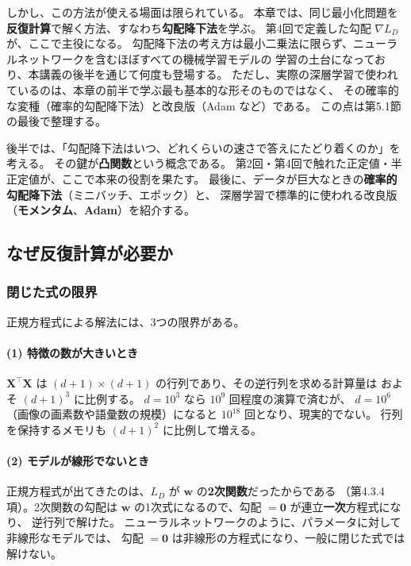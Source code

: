 しかし、この方法が使える場面は限られている。
本章では、同じ最小化問題を\textbf{反復計算}で解く方法、すなわち\textbf{勾配降下法}を学ぶ。
第4回で定義した勾配 $\nabla L_D$ が、ここで主役になる。
勾配降下法の考え方は最小二乗法に限らず、ニューラルネットワークを含むほぼすべての機械学習モデルの
学習の土台になっており、本講義の後半を通じて何度も登場する。
ただし、実際の深層学習で使われているのは、本章の前半で学ぶ最も基本的な形そのものではなく、
その確率的な変種（確率的勾配降下法）と改良版（Adam など）である。
この点は第5.1節の最後で整理する。

後半では、「勾配降下法はいつ、どれくらいの速さで答えにたどり着くのか」を考える。
その鍵が\textbf{凸関数}という概念である。
第2回・第4回で触れた正定値・半正定値が、ここで本来の役割を果たす。
最後に、データが巨大なときの\textbf{確率的勾配降下法}（ミニバッチ、エポック）と、
深層学習で標準的に使われる改良版（\textbf{モメンタム}、\textbf{Adam}）を紹介する。


\subsection{なぜ反復計算が必要か}

\subsubsection{閉じた式の限界}

正規方程式による解法には、3つの限界がある。

\paragraph{(1) 特徴の数が大きいとき}
$\bm{X}^\top\bm{X}$ は $(d+1) \times (d+1)$ の行列であり、その逆行列を求める計算量は
およそ $(d+1)^3$ に比例する。
$d = 10^3$ なら $10^9$ 回程度の演算で済むが、
$d = 10^6$（画像の画素数や語彙数の規模）になると $10^{18}$ 回となり、現実的でない。
行列を保持するメモリも $(d+1)^2$ に比例して増える。

\paragraph{(2) モデルが線形でないとき}
正規方程式が出てきたのは、$L_D$ が $\bm{w}$ の\textbf{2次関数}だったからである
（第4.3.4項）。2次関数の勾配は $\bm{w}$ の1次式になるので、勾配 $= \bm{0}$ が連立\textbf{一次}方程式になり、
逆行列で解けた。
ニューラルネットワークのように、パラメータに対して非線形なモデルでは、
勾配 $= \bm{0}$ は非線形の方程式になり、一般に閉じた式では解けない。


